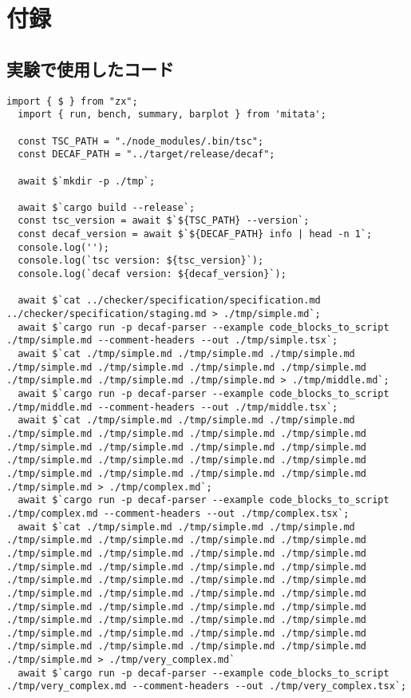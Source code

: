 \appendix
\chapter{付録}
\section{実験で使用したコード}

\begin{lstlisting}[caption={実験で使用したコード}, label={lst:benchmark}]
  import { $ } from "zx";
  import { run, bench, summary, barplot } from 'mitata';

  const TSC_PATH = "./node_modules/.bin/tsc";
  const DECAF_PATH = "../target/release/decaf";

  await $`mkdir -p ./tmp`;

  await $`cargo build --release`;
  const tsc_version = await $`${TSC_PATH} --version`;
  const decaf_version = await $`${DECAF_PATH} info | head -n 1`;
  console.log('');
  console.log(`tsc version: ${tsc_version}`);
  console.log(`decaf version: ${decaf_version}`);

  await $`cat ../checker/specification/specification.md ../checker/specification/staging.md > ./tmp/simple.md`;
  await $`cargo run -p decaf-parser --example code_blocks_to_script ./tmp/simple.md --comment-headers --out ./tmp/simple.tsx`;
  await $`cat ./tmp/simple.md ./tmp/simple.md ./tmp/simple.md ./tmp/simple.md ./tmp/simple.md ./tmp/simple.md ./tmp/simple.md ./tmp/simple.md ./tmp/simple.md ./tmp/simple.md > ./tmp/middle.md`;
  await $`cargo run -p decaf-parser --example code_blocks_to_script ./tmp/middle.md --comment-headers --out ./tmp/middle.tsx`;
  await $`cat ./tmp/simple.md ./tmp/simple.md ./tmp/simple.md ./tmp/simple.md ./tmp/simple.md ./tmp/simple.md ./tmp/simple.md ./tmp/simple.md ./tmp/simple.md ./tmp/simple.md ./tmp/simple.md ./tmp/simple.md ./tmp/simple.md ./tmp/simple.md ./tmp/simple.md ./tmp/simple.md ./tmp/simple.md ./tmp/simple.md ./tmp/simple.md ./tmp/simple.md > ./tmp/complex.md`;
  await $`cargo run -p decaf-parser --example code_blocks_to_script ./tmp/complex.md --comment-headers --out ./tmp/complex.tsx`;
  await $`cat ./tmp/simple.md ./tmp/simple.md ./tmp/simple.md ./tmp/simple.md ./tmp/simple.md ./tmp/simple.md ./tmp/simple.md ./tmp/simple.md ./tmp/simple.md ./tmp/simple.md ./tmp/simple.md ./tmp/simple.md ./tmp/simple.md ./tmp/simple.md ./tmp/simple.md ./tmp/simple.md ./tmp/simple.md ./tmp/simple.md ./tmp/simple.md ./tmp/simple.md ./tmp/simple.md ./tmp/simple.md ./tmp/simple.md ./tmp/simple.md ./tmp/simple.md ./tmp/simple.md ./tmp/simple.md ./tmp/simple.md ./tmp/simple.md ./tmp/simple.md ./tmp/simple.md ./tmp/simple.md ./tmp/simple.md ./tmp/simple.md ./tmp/simple.md ./tmp/simple.md ./tmp/simple.md ./tmp/simple.md ./tmp/simple.md ./tmp/simple.md > ./tmp/very_complex.md`
  await $`cargo run -p decaf-parser --example code_blocks_to_script ./tmp/very_complex.md --comment-headers --out ./tmp/very_complex.tsx`;


\end{lstlisting}
